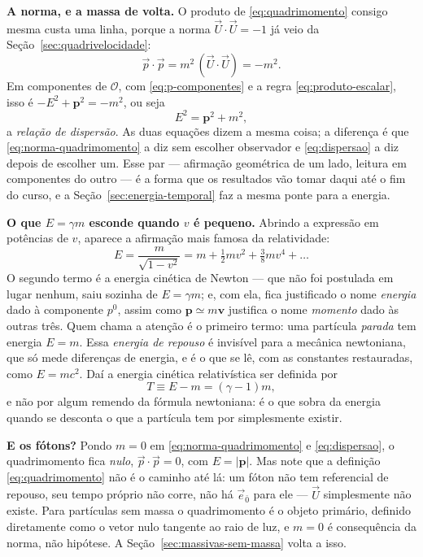 \documentclass[12pt,a4paper,oneside]{book}
\theoremstyle{rgplain}
\theoremstyle{rgremark}
\newcommand{\obs}{\mathcal{O}}
\begin{document}
\textbf{A norma, e a massa de volta.} O produto de \eqref{eq:quadrimomento}
consigo mesma custa uma linha, porque a norma $\vec U\cdot\vec U=-1$ já veio
da Seção~\ref{sec:quadrivelocidade}:
\begin{equation}
  \vec p\cdot\vec p=m^2\,(\vec U\cdot\vec U)=-m^2 .
  \label{eq:norma-quadrimomento}
\end{equation}
Em componentes de $\obs$, com \eqref{eq:p-componentes} e a regra
\eqref{eq:produto-escalar}, isso é $-E^2+\bm p^2=-m^2$, ou seja
\begin{equation}
  E^2=\bm p^2+m^2,
  \label{eq:dispersao}
\end{equation}
a \emph{relação de dispersão}. As duas equações dizem a mesma coisa; a
diferença é que \eqref{eq:norma-quadrimomento} a diz sem escolher observador e
\eqref{eq:dispersao} a diz depois de escolher um. Esse par --- afirmação
geométrica de um lado, leitura em componentes do outro --- é a forma que os
resultados vão tomar daqui até o fim do curso, e a Seção~\ref{sec:energia-temporal}
faz a mesma ponte para a energia.

\textbf{O que $E=\gamma m$ esconde quando $v$ é pequeno.} Abrindo a expressão em potências de $v$, aparece a afirmação mais famosa da relatividade:
\begin{equation}
  E=\frac{m}{\sqrt{1-v^2}}
   =m+\tfrac12 mv^2+\tfrac38 mv^4+\dots
  \label{eq:limite-newtoniano}
\end{equation}
O segundo termo é a energia cinética de Newton --- que não foi postulada em
lugar nenhum, saiu sozinha de $E=\gamma m$; e, com ela, fica justificado o nome
\emph{energia} dado à componente $p^0$, assim como $\bm p\simeq m\bm v$
justifica o nome \emph{momento} dado às outras três. Quem chama a atenção é o
primeiro termo: uma partícula \emph{parada} tem energia $E=m$. Essa
\emph{energia de repouso} é invisível para a mecânica newtoniana, que só mede
diferenças de energia, e é o que se lê, com as constantes restauradas, como
$E=mc^2$. Daí a energia cinética relativística ser definida por
\[
  T\equiv E-m=(\gamma-1)m,
\]
e não por algum remendo da fórmula newtoniana: é o que sobra da energia quando
se desconta o que a partícula tem por simplesmente existir.

\textbf{E os fótons?} Pondo $m=0$ em \eqref{eq:norma-quadrimomento} e
\eqref{eq:dispersao}, o quadrimomento fica \emph{nulo}, $\vec p\cdot\vec p=0$,
com $E=|\bm p|$. Mas note que a definição \eqref{eq:quadrimomento} não é o
caminho até lá: um fóton não tem referencial de repouso, seu tempo próprio não
corre, não há $\vec e_{\bar 0}$ para ele --- $\vec U$ simplesmente não existe. Para
partículas sem massa o quadrimomento é o objeto primário, definido diretamente
como o vetor nulo tangente ao raio de luz, e $m=0$ é consequência da norma, não
hipótese. A Seção~\ref{sec:massivas-sem-massa} volta a isso.
\end{document}
